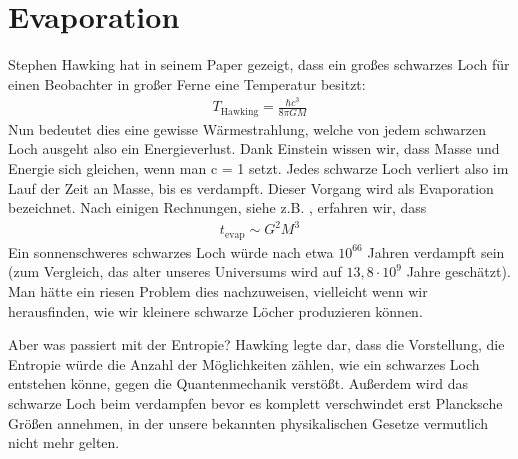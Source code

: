 \documentclass[ngerman]{scrartcl}
\begin{document}
\section{Evaporation}
Stephen Hawking hat in seinem Paper \cite{ParticleCreation} gezeigt, dass ein großes schwarzes Loch für einen Beobachter in großer Ferne eine Temperatur besitzt:
	\begin{align}
		T_{\text{Hawking}} = \frac{\hbar c^3}{8 \pi GM}
	\end{align}
Nun bedeutet dies eine gewisse Wärmestrahlung, welche von jedem schwarzen Loch ausgeht also ein Energieverlust. Dank Einstein wissen wir, dass Masse und Energie sich gleichen, wenn man c = 1 setzt. Jedes schwarze Loch verliert also im Lauf der Zeit an Masse, bis es verdampft. Dieser Vorgang wird als Evaporation bezeichnet. Nach einigen Rechnungen, siehe z.B. \cite{JerusalemsLectures}, erfahren wir, dass
	\begin{align}
		t_{\text{evap}} \sim G^2 M^3
	\end{align}
Ein sonnenschweres schwarzes Loch würde nach etwa $10^{66}$ Jahren verdampft sein (zum Vergleich, das alter unseres Universums wird auf $13,8 \cdot 10^{9}$ Jahre geschätzt). Man hätte ein riesen Problem dies nachzuweisen, vielleicht wenn wir herausfinden, wie wir kleinere schwarze Löcher produzieren können. 

Aber was passiert mit der Entropie?
Hawking \cite{BreakdownGravitationalCollapse} legte dar, dass die Vorstellung, die Entropie würde die Anzahl der Möglichkeiten zählen, wie ein schwarzes Loch entstehen könne, gegen die Quantenmechanik verstößt.
Außerdem wird das schwarze Loch beim verdampfen bevor es komplett verschwindet erst Plancksche Größen annehmen, in der unsere bekannten physikalischen Gesetze vermutlich nicht mehr gelten. 
	
\end{document}
